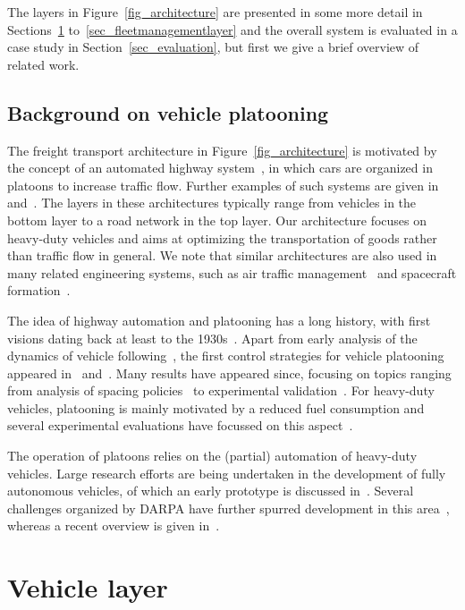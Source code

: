 \documentclass[journal]{IEEEtran}
\begin{document}
The layers in Figure~\ref{fig_architecture} are presented in some more detail in Sections~\ref{sec_vehiclelayer} to~\ref{sec_fleetmanagementlayer} and the overall system is evaluated in a case study in Section~\ref{sec_evaluation}, but first we give a brief overview of related work.


\subsection{Background on vehicle platooning}\label{sec_relatedwork}
The freight transport architecture in Figure~\ref{fig_architecture} is motivated by the concept of an automated highway system~\cite{varaiya_1993,horowitz_2000}, in which cars are organized in platoons to increase traffic flow. Further examples of such systems are given in~\cite{raza_1996} and~\cite{tsugawa_2000}. The layers in these architectures typically range from vehicles in the bottom layer to a road network in the top layer. Our architecture focuses on heavy-duty vehicles and aims at optimizing the transportation of goods rather than traffic flow in general. We note that similar architectures are also used in many related engineering systems, such as air traffic management~\cite{zhang_2012} and spacecraft formation~\cite{beard_2001}.

The idea of highway automation and platooning has a long history, with first visions dating back at least to the 1930s~\cite{gm_film_1940}. Apart from early analysis of the dynamics of vehicle following~\cite{chandler_1958}, the first control strategies for vehicle platooning appeared in~\cite{levine_1966}
and~\cite{melzer_1971,chu_1974}. Many results have appeared since, focusing on topics ranging from analysis of spacing policies~\cite{ioannou_1993,swaroop_1994} to experimental validation~\cite{naus_2010}. For heavy-duty vehicles, platooning is mainly  motivated by a reduced fuel consumption and several experimental
evaluations have focussed on this aspect~\cite{bonnet_2000,lammert_2014,alam_2015b}.

The operation of platoons relies on the (partial) automation of heavy-duty vehicles. Large research efforts are being undertaken in the development of fully autonomous vehicles, of which an early prototype is discussed in~\cite{dickmanns_1994}. Several challenges organized by DARPA have further spurred development in this area~\cite{buehler_2008}, whereas a recent overview is given in~\cite{bengler_2014}.




\section{Vehicle layer}\label{sec_vehiclelayer}
\end{document}
